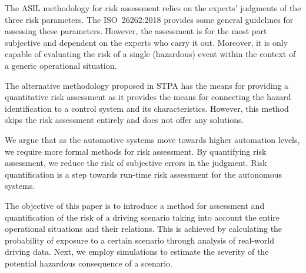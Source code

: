 The ASIL methodology for risk assessment relies on the experts’ judgments of the three risk parameters. The ISO~26262:2018 provides some general guidelines for assessing these parameters. However, the assessment is for the most part subjective and dependent on the experts who carry it out. Moreover, it is only capable of evaluating the risk of a single (hazardous) event within the context of a generic operational situation.

The alternative methodology proposed in STPA has the means for providing a quantitative risk assessment as it provides the means for connecting the hazard identification to a control system and its characteristics. However, this method skips the risk assessment entirely and does not offer any solutions. 

We argue that as the automotive systems move towards higher automation levels, we require more formal methods for risk assessment. By quantifying risk assessment, we reduce the risk of subjective errors in the judgment. Risk quantification is a step towards run-time risk assessment for the autonomous systems.  

The objective of this paper is to introduce a method for assessment and quantification of the risk of a driving scenario taking into account the entire operational situations and their relations. This is achieved by calculating the probability of exposure to a certain scenario through analysis of real-world driving data. Next, we employ simulations to estimate the severity of the potential hazardous consequence of a scenario.



